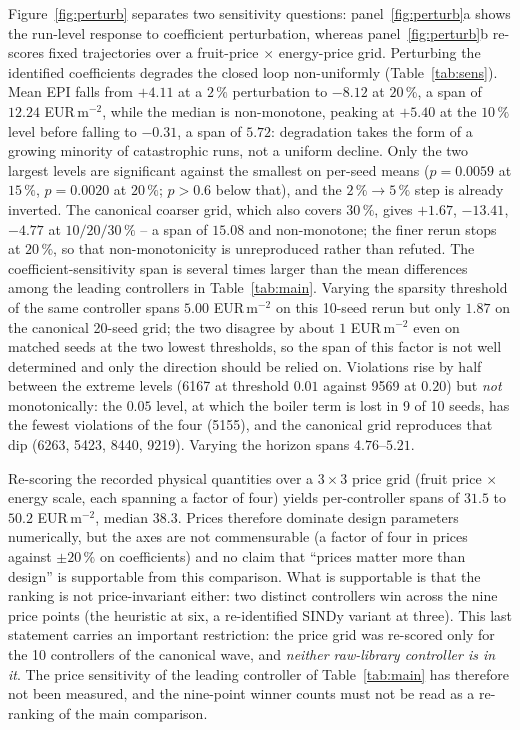 Figure~\ref{fig:perturb} separates two sensitivity questions: panel~\ref{fig:perturb}a
shows the run-level response to coefficient perturbation, whereas panel~\ref{fig:perturb}b
re-scores fixed trajectories over a fruit-price $\times$ energy-price grid. Perturbing the
identified coefficients degrades the closed loop non-uniformly
(Table~\ref{tab:sens}). Mean EPI falls from $+4.11$ at a
$2\,\%$ perturbation to $-8.12$ at
$20\,\%$, a span of $12.24$ EUR\,m$^{-2}$, while the median is non-monotone, peaking at $+5.40$ at the
$10\,\%$ level before falling to $-0.31$, a span of $5.72$: degradation takes the form of a growing minority of
catastrophic runs, not a uniform decline. Only the two largest levels are significant
against the smallest on per-seed means ($p=0.0059$ at $15\,\%$, $p=0.0020$ at $20\,\%$;
$p>0.6$ below that), and the $2\,\%\to5\,\%$ step is already inverted. The canonical
coarser grid, which also covers $30\,\%$, gives $+1.67$, $-13.41$, $-4.77$ at
$10/20/30\,\%$ -- a span of $15.08$ and non-monotone; the finer rerun stops at $20\,\%$, so
that non-monotonicity is unreproduced rather than refuted. The coefficient-sensitivity
span is several times larger than the mean differences among the leading controllers in
Table~\ref{tab:main}. Varying the sparsity threshold of the same controller spans $5.00$
EUR\,m$^{-2}$ on this 10-seed rerun but only $1.87$ on the canonical 20-seed grid; the two
disagree by about $1$ EUR\,m$^{-2}$ even on matched seeds at the two lowest thresholds, so
the span of this factor is not well determined and only the direction should be relied on.
Violations rise by half between the extreme levels (6167 at threshold $0.01$ against 9569
at $0.20$) but \emph{not} monotonically: the $0.05$ level, at which the boiler term is lost
in 9 of 10 seeds, has the fewest violations of the four (5155), and the canonical grid
reproduces that dip (6263, 5423, 8440, 9219). Varying the horizon spans $4.76$--$5.21$.

Re-scoring the recorded physical quantities over a $3\times3$ price grid (fruit price
$\times$ energy scale, each spanning a factor of four) yields per-controller spans of
$31.5$ to $50.2$ EUR\,m$^{-2}$, median $38.3$. Prices therefore dominate design parameters
numerically, but the axes are not commensurable (a factor of four in prices against $\pm20\,\%$ on coefficients) and no claim that ``prices matter more than design'' is
supportable from this comparison. What is supportable is that the ranking is not
price-invariant either: two distinct controllers win across the nine price points (the
heuristic at six, a re-identified SINDy variant at three). This last statement carries an
important restriction: the price grid was re-scored only for the 10 controllers of the
canonical wave, and \emph{neither raw-library controller is in it}. The price sensitivity
of the leading controller of Table~\ref{tab:main} has therefore not been measured, and the
nine-point winner counts must not be read as a re-ranking of the main comparison.

